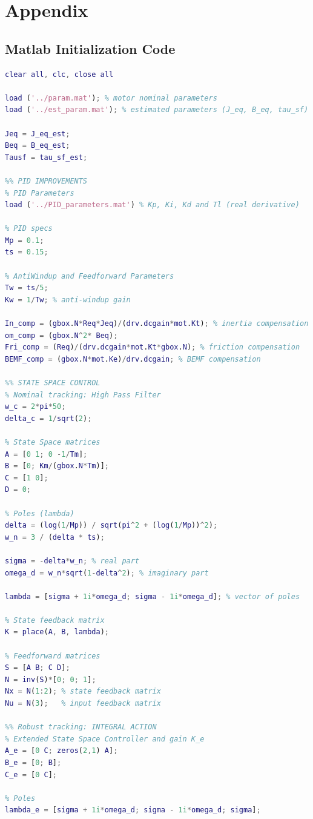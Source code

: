 \appendix
\section{Appendix}

\subsection{Matlab Initialization Code}

\begin{lstlisting}[language=Matlab]
%% LAB1: POSITION S.S. CONTROL
clear all, clc, close all

load ('../param.mat'); % motor nominal parameters
load ('../est_param.mat'); % estimated parameters (J_eq, B_eq, tau_sf)

Jeq = J_eq_est; 
Beq = B_eq_est; 
Tausf = tau_sf_est; 

%% PID IMPROVEMENTS
% PID Parameters
load ('../PID_parameters.mat') % Kp, Ki, Kd and Tl (real derivative)

% PID specs
Mp = 0.1;
ts = 0.15;

% AntiWindup and Feedforward Parameters 
Tw = ts/5; 
Kw = 1/Tw; % anti-windup gain

In_comp = (gbox.N*Req*Jeq)/(drv.dcgain*mot.Kt); % inertia compensation
om_comp = (gbox.N^2* Beq); 
Fri_comp = (Req)/(drv.dcgain*mot.Kt*gbox.N); % friction compensation
BEMF_comp = (gbox.N*mot.Ke)/drv.dcgain; % BEMF compensation

%% STATE SPACE CONTROL 
% Nominal tracking: High Pass Filter
w_c = 2*pi*50;
delta_c = 1/sqrt(2);

% State Space matrices
A = [0 1; 0 -1/Tm];
B = [0; Km/(gbox.N*Tm)];
C = [1 0];
D = 0;

% Poles (lambda)
delta = (log(1/Mp)) / sqrt(pi^2 + (log(1/Mp))^2);
w_n = 3 / (delta * ts); 

sigma = -delta*w_n; % real part
omega_d = w_n*sqrt(1-delta^2); % imaginary part

lambda = [sigma + 1i*omega_d; sigma - 1i*omega_d]; % vector of poles

% State feedback matrix
K = place(A, B, lambda); 

% Feedforward matrices
S = [A B; C D];
N = inv(S)*[0; 0; 1];
Nx = N(1:2); % state feedback matrix
Nu = N(3);   % input feedback matrix

%% Robust tracking: INTEGRAL ACTION
% Extended State Space Controller and gain K_e
A_e = [0 C; zeros(2,1) A];
B_e = [0; B];
C_e = [0 C];

% Poles 
lambda_e = [sigma + 1i*omega_d; sigma - 1i*omega_d; sigma]; 


\end{lstlisting}

